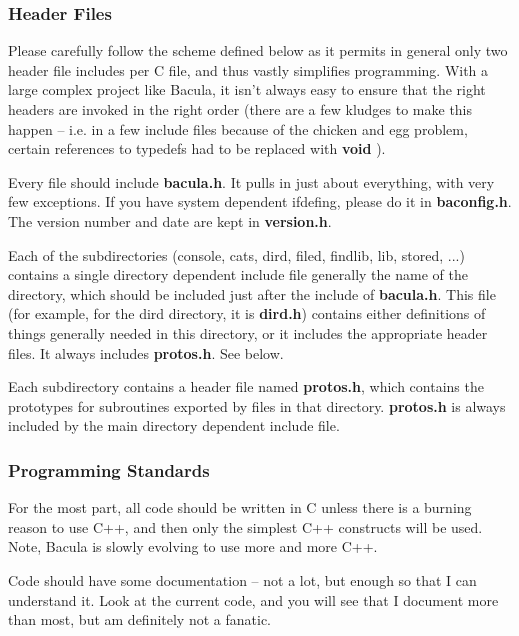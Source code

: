 \subsubsection*{Header Files}

Please carefully follow the scheme defined below as it permits in general only
two header file includes per C file, and thus vastly simplifies programming.
With a large complex project like Bacula, it isn't always easy to ensure that
the right headers are invoked in the right order (there are a few kludges to
make this happen -- i.e. in a few include files because of the chicken and egg
problem, certain references to typedefs had to be replaced with {\bf void} ). 

Every file should include {\bf bacula.h}. It pulls in just about everything,
with very few exceptions. If you have system dependent ifdefing, please do it
in {\bf baconfig.h}. The version number and date are kept in {\bf version.h}. 

Each of the subdirectories (console, cats, dird, filed, findlib, lib, stored,
...) contains a single directory dependent include file generally the name of
the directory, which should be included just after the include of {\bf
bacula.h}. This file (for example, for the dird directory, it is {\bf dird.h})
contains either definitions of things generally needed in this directory, or
it includes the appropriate header files. It always includes {\bf protos.h}.
See below. 

Each subdirectory contains a header file named {\bf protos.h}, which contains
the prototypes for subroutines exported by files in that directory. {\bf
protos.h} is always included by the main directory dependent include file. 

\subsubsection*{Programming Standards}

For the most part, all code should be written in C unless there is a burning
reason to use C++, and then only the simplest C++ constructs will be used.
Note, Bacula is slowly evolving to use more and more C++. 

Code should have some documentation -- not a lot, but enough so that I can
understand it. Look at the current code, and you will see that I document more
than most, but am definitely not a fanatic. 

